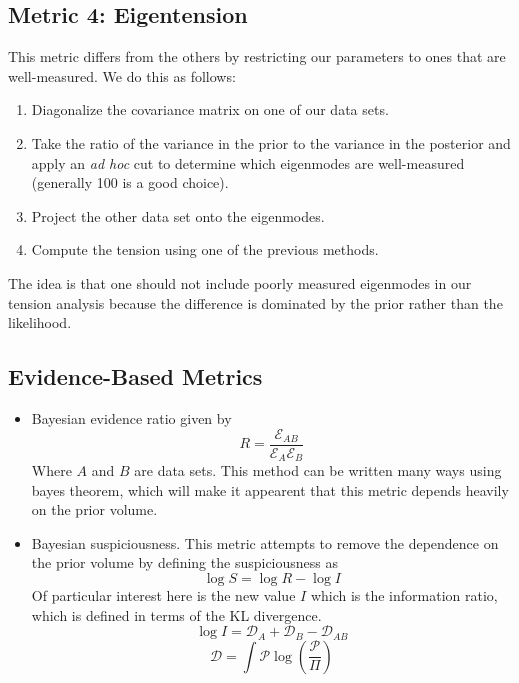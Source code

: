 \subsection{Metric 4: Eigentension}
This metric differs from the others by restricting our parameters to ones that are well-measured. We do this as follows:
\begin{enumerate}
	\item Diagonalize the covariance matrix on one of our data sets.
	\item Take the ratio of the variance in the prior to the variance in the posterior and apply an \textit{ad hoc} cut to determine which eigenmodes are well-measured (generally 100 is a good choice).
	\item Project the other data set onto the eigenmodes.
	\item Compute the tension using one of the previous methods.
\end{enumerate}
The idea is that one should not include poorly measured eigenmodes in our tension analysis because the difference is dominated by the prior rather than the likelihood.
\subsection{Evidence-Based Metrics}
\begin{itemize}
	\item Bayesian evidence ratio given by
	\begin{equation}
		R = \frac{\mathcal{E}_{AB}}{\mathcal{E}_A\mathcal{E}_B}
	\end{equation}
	Where $A$ and $B$ are data sets. This method can be written many ways using bayes theorem, which will make it appearent that this metric depends heavily on the prior volume.
    \item Bayesian suspiciousness. This metric attempts to remove the dependence on the prior volume by defining the suspiciousness as 
	\begin{equation}
		\log S = \log R - \log I
	\end{equation}
	Of particular interest here is the new value $I$ which is the information ratio, which is defined in terms of the KL divergence.
	\begin{equation}
		\log I = \mathcal{D}_A + \mathcal{D}_B - \mathcal{D}_{AB}
	\end{equation}
	\begin{equation}
		\mathcal{D} = \int \mathcal{P} \log(\frac{\mathcal{P}}{\Pi})
	\end{equation}
\end{itemize}
